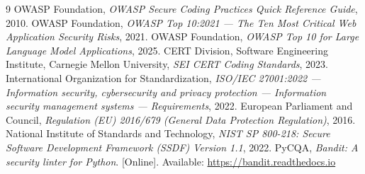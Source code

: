\documentclass[10pt,journal,onecolumn]{IEEEtran}
\begin{document}
\begin{thebibliography}{9}
\footnotesize
{} OWASP Foundation, \emph{OWASP Secure Coding Practices Quick Reference Guide}, 2010.
 OWASP Foundation, \emph{OWASP Top 10:2021 --- The Ten Most Critical Web Application Security Risks}, 2021.
 OWASP Foundation, \emph{OWASP Top 10 for Large Language Model Applications}, 2025.
 CERT Division, Software Engineering Institute, Carnegie Mellon University, \emph{SEI CERT Coding Standards}, 2023.
 International Organization for Standardization, \emph{ISO/IEC 27001:2022 --- Information security, cybersecurity and privacy protection --- Information security management systems --- Requirements}, 2022.
 European Parliament and Council, \emph{Regulation (EU) 2016/679 (General Data Protection Regulation)}, 2016.
 National Institute of Standards and Technology, \emph{NIST SP 800-218: Secure Software Development Framework (SSDF) Version 1.1}, 2022.
 PyCQA, \emph{Bandit: A security linter for Python}. [Online]. Available: \url{https://bandit.readthedocs.io}
\end{thebibliography}
\end{document}
